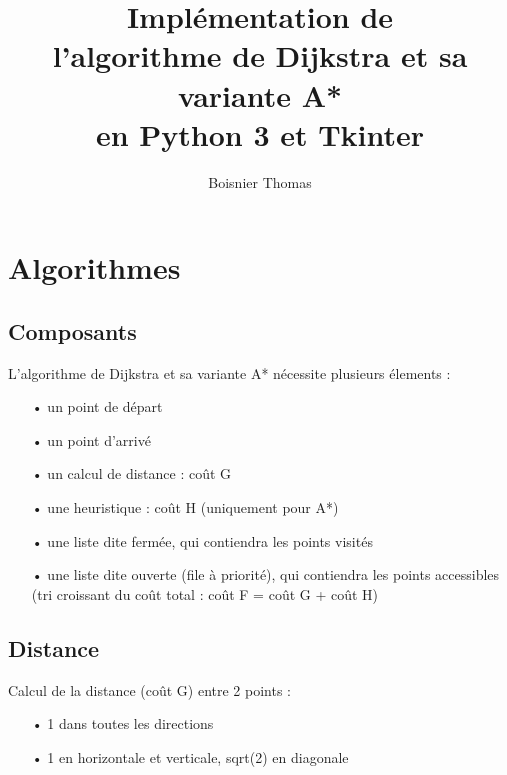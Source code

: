 \documentclass[11pt]{beamer}
\title{Implémentation de\\l'algorithme de Dijkstra et sa variante A*\\en Python 3 et Tkinter}
\author{Boisnier Thomas}
\begin{document}
\begin{frame}[noframenumbering]
	\thispagestyle{empty}
	\titlepage
\end{frame}

\begin{frame}
	\tableofcontents
\end{frame}

\section{Algorithmes}
	\subsection{Composants}
		\begin{frame}
			L'algorithme de Dijkstra et sa variante A* nécessite plusieurs élements :
			\begin{itemize}
		        \item[•] un point de départ
		        \item[•] un point d'arrivé
		        \item[•] un calcul de distance : coût G
		        \item[•] une heuristique : coût H (uniquement pour A*)
		        \item[•] une liste dite fermée, qui contiendra les points visités
		        \item[•] une liste dite ouverte (file à priorité), qui contiendra les points accessibles \\ (tri croissant du coût total : coût F = coût G + coût H)
			\end{itemize}
		\end{frame}
	
	\subsection{Distance}
		\begin{frame}
			Calcul de la distance (coût G) entre 2 points :
			\begin{itemize}
				\item[•] 1 dans toutes les directions
				\item[•] 1 en horizontale et verticale, sqrt(2) en diagonale
			\end{itemize}
		\end{frame}
		
\end{document}
